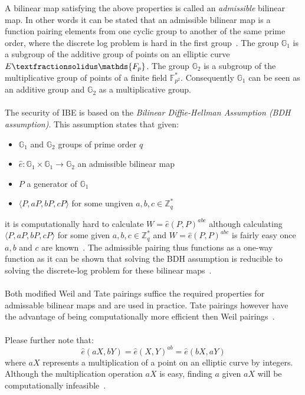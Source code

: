 \documentclass[journal]{IEEEtran}
\begin{document}
A bilinear map satisfying the above properties is called an \textit{admissible}
bilinear map. In other words it can be stated that an admissible bilinear map
is a function pairing elements from one cyclic group to another of the same
prime order, where the discrete log problem is hard in the first
group~\cite{YoungbloodIntroduction}. The group $\mathds{G}_1$ is a subgroup of
the additive group of points on an elliptic curve $E\textfractionsolidus
\mathds{F_{p}}$. The group $\mathds{G}_2$ is a subgroup of the multiplicative
group of points of a finite field $\mathds{F}_{p^{2}}^{*}$. Consequently
$\mathds{G}_1$ can be seen as an additive group and $\mathds{G}_2$ as a
multiplicative group.~\cite{BonehFranklinIBE}\\
\\
The security of IBE is based on the \textit{Bilinear Diffie-Hellman
Assumption (BDH assumption)}. This assumption states that given:
\begin{itemize}
 \item $\mathds{G}_1$ and $\mathds{G}_2$ groups of prime order $q$
 \item $\hat{e}: \mathds{G}_1 \times \mathds{G}_1 \rightarrow \mathds{G}_2$ an
admissible bilinear map
 \item $P$ a generator of $\mathds{G}_1$
 \item $\langle P, aP, bP, cP \rangle$ for some ungiven $a, b, c \in
\mathds{Z}_{q}^{*}$
\end{itemize}
it is computationally hard to calculate $W = \hat{e} \left( P , P \right)^{abc}$
although calculating $\langle P, aP, bP, cP \rangle$ for some given $a, b, c \in
\mathds{Z}_{q}^{*}$ and  $W = \hat{e} \left( P , P \right)^{abc}$ is fairly
easy once $a, b$ and $c$ are known~\cite{BonehFranklinIBE}. The admissible
pairing thus functions as a one-way function as it can be shown that solving the
BDH assumption is reducible to solving the discrete-log problem for these
bilinear maps~\cite{YoungbloodIntroduction}.\\
\\
Both modified Weil and Tate pairings suffice the required properties for
admissable bilinear maps and are used in practice. Tate pairings however have
the advantage of being computationally more efficient then Weil
pairings~\cite{YacovBilinear}.\\
\\
Please further note that:
\begin{equation} \label{eq:sym}
 \hat{e} \left( aX, bY\right) = \hat{e} \left( X, Y\right)^{ab} = \hat{e} \left(
bX, aY\right)
\end{equation}
where $aX$ represents a multiplication of a point on an elliptic curve by
integers. Although the multiplication operation $aX$ is easy, finding $a$ given
$aX$ will be computationally infeasible~\cite{YoungbloodIntroduction}.
\end{document}
